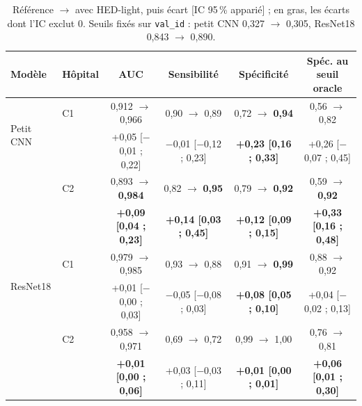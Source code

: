 \documentclass[11pt,a4paper]{article}
\newcommand{\best}[1]{\textbf{#1}}
\begin{document}
\begin{table}[H]
\centering\footnotesize\setlength{\tabcolsep}{3pt}
\begin{tabular}{llcccc}
\toprule
\textbf{Modèle} & \textbf{Hôpital} & \textbf{AUC} & \textbf{Sensibilité} & \textbf{Spécificité} & \textbf{Spéc. au seuil oracle} \\
\midrule
\multirow{2}{*}{Petit CNN} & C1 & 0,912 $\to$ 0,966 & 0,90 $\to$ 0,89 & 0,72 $\to$ \best{0,94} & 0,56 $\to$ 0,82 \\
 & & {\scriptsize +0,05 [$-$0,01 ; 0,22]} & {\scriptsize $-$0,01 [$-$0,12 ; 0,23]} & {\scriptsize \best{+0,23 [0,16 ; 0,33]}} & {\scriptsize +0,26 [$-$0,07 ; 0,45]} \\
 & C2 & 0,893 $\to$ \best{0,984} & 0,82 $\to$ \best{0,95} & 0,79 $\to$ \best{0,92} & 0,59 $\to$ \best{0,92} \\
 & & {\scriptsize \best{+0,09 [0,04 ; 0,23]}} & {\scriptsize \best{+0,14 [0,03 ; 0,45]}} & {\scriptsize \best{+0,12 [0,09 ; 0,15]}} & {\scriptsize \best{+0,33 [0,16 ; 0,48]}} \\
\midrule
\multirow{2}{*}{ResNet18} & C1 & 0,979 $\to$ 0,985 & 0,93 $\to$ 0,88 & 0,91 $\to$ \best{0,99} & 0,88 $\to$ 0,92 \\
 & & {\scriptsize +0,01 [$-$0,00 ; 0,03]} & {\scriptsize $-$0,05 [$-$0,08 ; 0,03]} & {\scriptsize \best{+0,08 [0,05 ; 0,10]}} & {\scriptsize +0,04 [$-$0,02 ; 0,13]} \\
 & C2 & 0,958 $\to$ 0,971 & 0,69 $\to$ 0,72 & 0,99 $\to$ 1,00 & 0,76 $\to$ 0,81 \\
 & & {\scriptsize \best{+0,01 [0,00 ; 0,06]}} & {\scriptsize +0,03 [$-$0,03 ; 0,11]} & {\scriptsize \best{+0,01 [0,00 ; 0,01]}} & {\scriptsize \best{+0,06 [0,01 ; 0,30]}} \\
\bottomrule
\end{tabular}
\caption{Référence $\to$ avec HED-light, puis écart [IC 95\,\% apparié] ; en gras, les écarts dont l'IC exclut 0. Seuils fixés sur
\texttt{val\_id} : petit CNN 0,327 $\to$ 0,305, ResNet18 0,843 $\to$ 0,890.}
\label{tab:hed}
\end{table}
\end{document}
